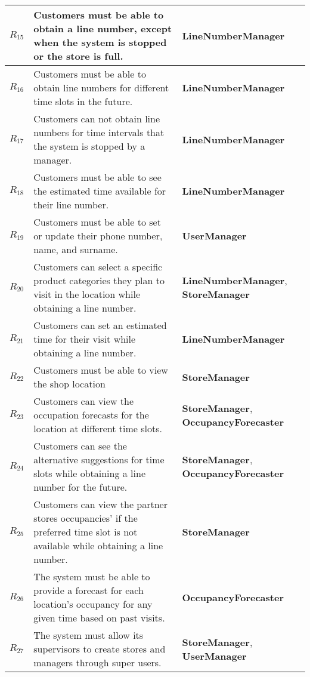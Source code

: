 \begin{table}[H]
\begin{tabular}{|p{2cm}|p{10cm}|p{4cm}|}
        $R_{15}$ & Customers must be able to obtain a line number, except when the system is stopped or the store is full. & \textbf{LineNumberManager} \\ \hline
        $R_{16}$ & Customers must be able to obtain line numbers for different time slots in the future. &  \textbf{LineNumberManager} \\ \hline
        $R_{17}$ & Customers can not obtain line numbers for time intervals that the system is stopped by a manager. & \textbf{LineNumberManager} \\ \hline
        $R_{18}$ & Customers must be able to see the estimated time available for their line number. & \textbf{LineNumberManager} \\ \hline
        $R_{19}$ & Customers must be able to set or update their phone number, name, and surname. & \textbf{UserManager} \\ \hline
        $R_{20}$ & Customers can select a specific product categories they plan to visit in the location while obtaining a line number. & \textbf{LineNumberManager}, \textbf{StoreManager} \\ \hline
        $R_{21}$ & Customers can set an estimated time for their visit while obtaining a line number. & \textbf{LineNumberManager} \\ \hline
        $R_{22}$ & Customers must be able to view the shop location & \textbf{StoreManager} \\ \hline
        $R_{23}$ & Customers can view the occupation forecasts for the location at different time slots. & \textbf{StoreManager}, \textbf{OccupancyForecaster} \\ \hline
        $R_{24}$ & Customers can see the alternative suggestions for time slots while obtaining a line number for the future. & \textbf{StoreManager}, \textbf{OccupancyForecaster} \\ \hline
        $R_{25}$ & Customers can view the partner stores occupancies' if the preferred time slot is not available while obtaining a line number. & \textbf{StoreManager} \\ \hline
        $R_{26}$ & The system must be able to provide a forecast for each location's occupancy for any given time based on past visits. & \textbf{OccupancyForecaster} \\ \hline
        $R_{27}$ & The system must allow its supervisors to create stores and managers through super users. & \textbf{StoreManager}, \textbf{UserManager} \\ \hline
    \end{tabular}
\end{table}

